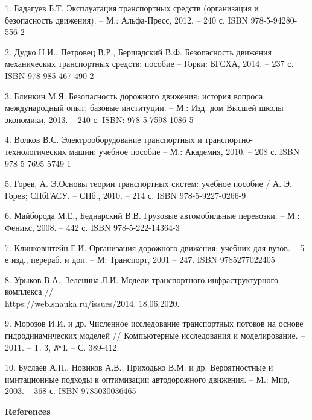 \begin{noparindent}

1. Бадагуев Б.Т. Эксплуатация транспортных средств (организация и
безопасность движения). -- М.: Альфа-Пресс, 2012. -- 240 с. ISBN
978-5-94280-556-2

2. Дудко Н.И., Петровец В.Р., Бершадский В.Ф. Безопасность движения
механических транспортных средств: пособие -- Горки: БГСХА, 2014. -- 237
с. ISBN 978-985-467-490-2

3. Блинкин М.Я. Безопасность дорожного движения: история вопроса,
международный опыт, базовые институции. -- М.: Изд. дом Высшей школы
экономики, 2013. -- 240 с. ISBN: 978-5-7598-1086-5

4. Волков В.С. Электрооборудование транспортных и
транспортно-технологических машин: учебное пособие -- М.: Академия,
2010. -- 208 с. ISBN 978-5-7695-5749-1

5. Горев, А. Э.Основы теории транспортных систем: учебное пособие / А.
Э. Горев; СПбГАСУ. -- СПб., 2010. -- 214 с. ISBN 978-5-9227-0266-9

6. Майборода М.Е., Беднарский В.В. Грузовые автомобильные перевозки. --
М.: Феникс, 2008. -- 442 с. ISBN 978-5-222-14364-3

7. Клинковштейн Г.И. Организация дорожного движения: учебник для вузов.
-- 5-е изд., перераб. и доп. -- М: Транспорт, 2001 -- 247. ISBN
9785277022405

8. Урыков В.А., Зеленина Л.И. Модели транспортного инфраструктурного
комплекса //\\ https://web.snauka.ru/issues/2014. 18.06.2020.

9. Морозов И.И. и др. Численное исследование транспортных потоков на
основе гидродинамических моделей // Компьютерные исследования и
моделирование. -- 2011. -- Т. 3, №4. -- С. 389-412.

10. Буслаев А.П., Новиков А.В., Приходько В.М. и др. Вероятностные и
имитационные подходы к оптимизации автодорожного движения. -- М.: Мир,
2003. -- 368 с. ISBN 9785030036465
\end{noparindent}

\begin{center}
  {\bfseries References}
  \end{center}

